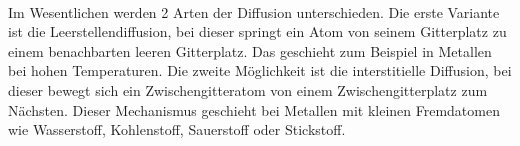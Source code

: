 \documentclass[11pt,a4paper]{article}
\numberwithin{equation}{section}
\numberwithin{figure}{section}
\begin{document}
\\
\begin{addmargin}[25pt]{0pt}
Im Wesentlichen werden 2 Arten der Diffusion unterschieden. Die erste Variante ist die Leerstellendiffusion, bei dieser springt ein Atom von seinem Gitterplatz zu einem benachbarten leeren Gitterplatz. Das geschieht zum Beispiel in Metallen bei hohen Temperaturen. Die zweite Möglichkeit ist die interstitielle Diffusion, bei dieser bewegt sich ein Zwischengitteratom von einem Zwischengitterplatz zum Nächsten.  Dieser Mechanismus geschieht bei Metallen mit kleinen Fremdatomen wie Wasserstoff, Kohlenstoff, Sauerstoff oder Stickstoff.\\
\end{addmargin} 
\end{document}

